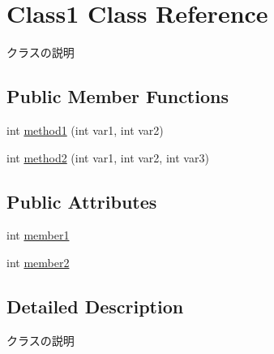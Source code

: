 \hypertarget{classClass1}{\section{Class1 Class Reference}
\label{classClass1}
}


クラスの説明  


\subsection*{Public Member Functions}
\begin{DoxyCompactItemize}
\item 
int \hyperlink{classClass1_adaf2b242399a61104ed097efebd3ffcc}{method1} (int var1, int var2)
\item 
int \hyperlink{classClass1_a13f59e7c646c01aa01b7fd86c3a3e29c}{method2} (int var1, int var2, int var3)
\end{DoxyCompactItemize}
\subsection*{Public Attributes}
\begin{DoxyCompactItemize}
\item 
int \hyperlink{classClass1_ab24aea43b371701c594cac3d29d49e3a}{member1}
\item 
int \hyperlink{classClass1_a21971b998fbe09a9c0578fa163b6192b}{member2}
\end{DoxyCompactItemize}


\subsection{Detailed Description}
クラスの説明 

